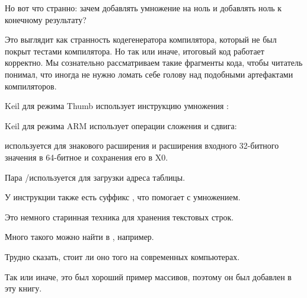 \myindex{\CompilerAnomaly}
\label{MSVC2013_anomaly}
Но вот что странно: зачем добавлять умножение на ноль и добавлять ноль к конечному результату?

Это выглядит как странность кодегенератора компилятора, который не был покрыт тестами
компилятора. Но так или иначе, итоговый код работает корректно.
Мы сознательно рассматриваем такие фрагменты кода, чтобы читатель понимал, что иногда не нужно
ломать себе голову над подобными артефактами компиляторов.


\Optimizing Keil для режима Thumb использует инструкцию умножения :



\Optimizing Keil для режима ARM использует операции сложения и сдвига:






 используется для знакового расширения и расширения
входного 32-битного значения в 64-битное и сохранения его в X0.

Пара \ADRP/\ADD используется для загрузки адреса таблицы.

У инструкции \ADD также есть суффикс \LSL, что помогает с умножением.



\subsectionold{\Conclusion{}}

Это немного старинная техника для хранения текстовых строк.

Много такого можно найти в \oracle, например.

Трудно сказать, стоит ли оно того на современных компьютерах.

Так или иначе, это был хороший пример массивов, поэтому он был добавлен в эту книгу.

